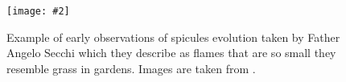 \documentclass[12pt]{ociamthesis}
\newcommand{\mfig}[4]{
  \begin{figure}
  \begin{center}
  \texttt{[image: \#2]}
  \caption{#3}
  \label{#4}
  \end{center}
  \end{figure}}
\begin{document}
%
%
\mfig{0.75}{figures/flammes_alt.png}{Example of early observations of spicules evolution taken by Father Angelo Secchi which they describe as flames that are so small they resemble grass in gardens. Images are taken from \cite{Secchi1877}.}{de_flammes}
\end{document}
